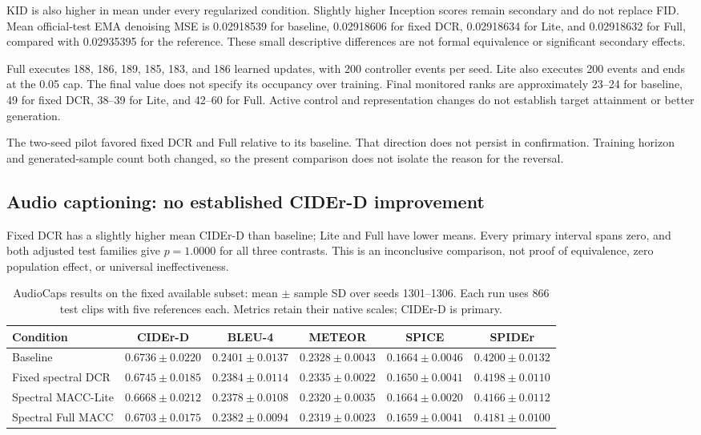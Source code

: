 \documentclass[a4paper,fleqn]{cas-dc}
\let\CAENLcaption\caption
\let\caption\CAENLcaption
\begin{document}
KID is also higher in mean under every regularized condition.
Slightly higher Inception scores remain secondary and do not
replace FID.
Mean official-test EMA denoising MSE is 0.02918539 for baseline,
0.02918606 for fixed DCR, 0.02918634 for Lite, and
0.02918632 for Full, compared with 0.02935395 for the reference.
These small descriptive differences are not formal
equivalence or significant secondary effects.

Full executes 188, 186, 189, 185, 183, and 186 learned
updates, with 200 controller events per seed.
Lite also executes 200 events and ends at the 0.05 cap.
The final value does not specify its occupancy over training.
Final monitored ranks are approximately 23--24 for baseline,
49 for fixed DCR, 38--39 for Lite, and 42--60 for Full.
Active control and representation changes do not establish
target attainment or better generation.

The two-seed pilot favored fixed DCR and Full relative to its
baseline. That direction does not persist in confirmation.
Training horizon and generated-sample count both changed,
so the present comparison does not isolate the reason
for the reversal.

\subsection{Audio captioning: no established CIDEr-D improvement}
\label{sec:audio_results}

Fixed DCR has a slightly higher mean CIDEr-D than baseline;
Lite and Full have lower means.
Every primary interval spans zero, and both adjusted test
families give $p=1.0000$ for all three contrasts.
This is an inconclusive comparison, not proof of equivalence,
zero population effect, or universal ineffectiveness.


\begin{table}[pos=tbp]
\caption{AudioCaps results on the fixed available subset:
mean $\pm$ sample SD over seeds 1301--1306.
Each run uses 866 test clips with five references each.
Metrics retain their native scales; CIDEr-D is primary.}
\label{tab:audio_final}
\centering\small
\begin{tabularx}{\textwidth}{@{}Yccccc@{}}
\toprule
Condition & CIDEr-D & BLEU-4 & METEOR & SPICE & SPIDEr \\
\midrule
Baseline &
$0.6736\pm0.0220$ & $0.2401\pm0.0137$ &
$0.2328\pm0.0043$ & $0.1664\pm0.0046$ & $0.4200\pm0.0132$ \\
Fixed spectral DCR &
$0.6745\pm0.0185$ & $0.2384\pm0.0114$ &
$0.2335\pm0.0022$ & $0.1650\pm0.0041$ & $0.4198\pm0.0110$ \\
Spectral MACC-Lite &
$0.6668\pm0.0212$ & $0.2378\pm0.0108$ &
$0.2320\pm0.0035$ & $0.1664\pm0.0020$ & $0.4166\pm0.0112$ \\
Spectral Full MACC &
$0.6703\pm0.0175$ & $0.2382\pm0.0094$ &
$0.2319\pm0.0023$ & $0.1659\pm0.0041$ & $0.4181\pm0.0100$ \\
\bottomrule
\end{tabularx}
\end{table}
\end{document}
